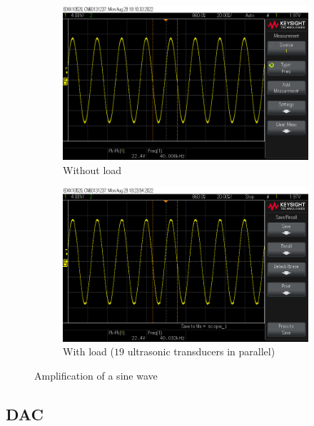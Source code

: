 \begin{figure}
  \centering
  \begin{subfigure}[b]{0.8\textwidth}
    \includegraphics[width=\textwidth]{src/assets/pictures/measurements/sin_40kHz_no_load.png}
    \caption{Without load}
    \label{fig:meas:circ:amp_sin_nol}
  \end{subfigure}
  \hfill
  \begin{subfigure}[b]{0.8\textwidth}
    \includegraphics[width=\textwidth]{src/assets/pictures/measurements/sin_40kHz_load_47nF_16Ohm.png}
    \caption{With load ($19$ ultrasonic transducers in parallel)}
    \label{fig:meas:circ:amp_sin_l}
  \end{subfigure}
  \caption{Amplification of a sine wave}
  \label{fig:meas:circ:amp_sin}
\end{figure}

\subsection{DAC}\label{sec:meas:circuit:dac}

